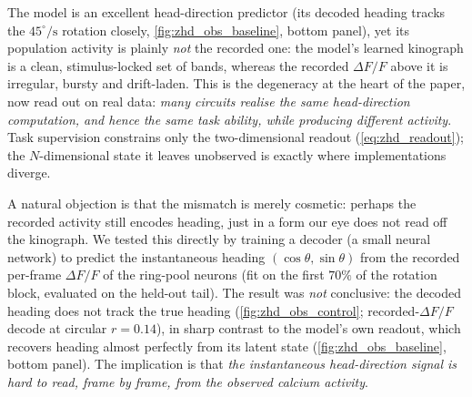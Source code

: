 \documentclass[11pt]{article}
\begin{document}
The model is an excellent head-direction predictor (its decoded heading
tracks the $45^\circ/\mathrm{s}$ rotation closely,
\cref{fig:zhd_obs_baseline}, bottom panel), yet its population activity is
plainly \emph{not} the recorded one: the model's learned kinograph is a
clean, stimulus-locked set of bands, whereas the recorded $\Delta F/F$
above it is irregular, bursty and drift-laden. This
is the degeneracy at the heart of the paper, now read out on real data:
\emph{many circuits realise the same head-direction computation, and hence
the same task ability, while producing different activity}. Task
supervision constrains only the two-dimensional readout
(\cref{eq:zhd_readout}); the $N$-dimensional state it leaves unobserved is
exactly where implementations diverge.

A natural objection is that the mismatch is merely cosmetic: perhaps the
recorded activity still encodes heading, just in a form our eye does not
read off the kinograph. We tested this directly by training a decoder
(a small neural network) to predict the instantaneous heading
$(\cos\theta,\sin\theta)$ from the recorded per-frame $\Delta F/F$ of the
ring-pool neurons (fit on the first $70\%$ of the rotation block,
evaluated on the held-out tail). The result was \emph{not} conclusive: the
decoded heading does not track the true heading
(\cref{fig:zhd_obs_control}; recorded-$\Delta F/F$ decode at circular
$r=0.14$), in sharp contrast to the model's own readout, which
recovers heading almost perfectly from its latent state
(\cref{fig:zhd_obs_baseline}, bottom panel). The implication is that \emph{the
instantaneous head-direction signal is hard to read, frame by frame, from
the observed calcium activity}.
\end{document}

